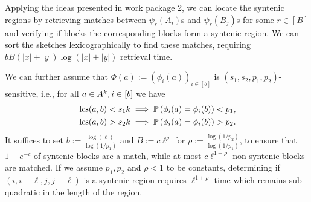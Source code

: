 Applying the ideas presented in work package 2, we can locate the syntenic regions by retrieving matches between $\psi_r(A_i)$s and $\psi_r(B_j)$s for some $r\in[B]$ and verifying if blocks the corresponding blocks form a syntenic region. We can sort the sketches lexicographically to find these matches, requiring $b B (|x|+|y|)\log(|x|+|y|)$ retrieval time. 

We can further assume that $\Phi(a):=(\phi_i(a))_{i\in[b]}$ is $(s_1,s_2, p_1, p_2)$-sensitive, i.e., for all $ a\in A^k, i\in[b]$ we have
\begin{align}
    &\operatorname{\mathrm{lcs}}(a,b)<s_1 k \implies \mathbb{P}\left( \phi_i(a)=\phi_i(b) \right) < p_1, \\
    &\operatorname{\mathrm{lcs}}(a,b)>s_2 k \implies \mathbb{P}\left( \phi_i(a)=\phi_i(b) \right) > p_2.
\end{align}
It suffices to set $b:=\frac{\log(\ell)}{\log(1/p_1)}$ and $B:=c \ell^\rho$ for $\rho:=\frac{\log(1/p_2)}{\log(1/p_1)}$, to ensure that $1-e^{-c}$ of syntenic blocks are a match, while at most $c \ell^{1+\rho} $ non-syntenic blocks are matched. If we assume $p_1, p_2$ and $\rho < 1$ to be constants, determining if $(i,i+\ell, j, j+\ell)$ is a syntenic region requires $\ell^{1+\rho}$ time which remains sub-quadratic in the length of the region.  






